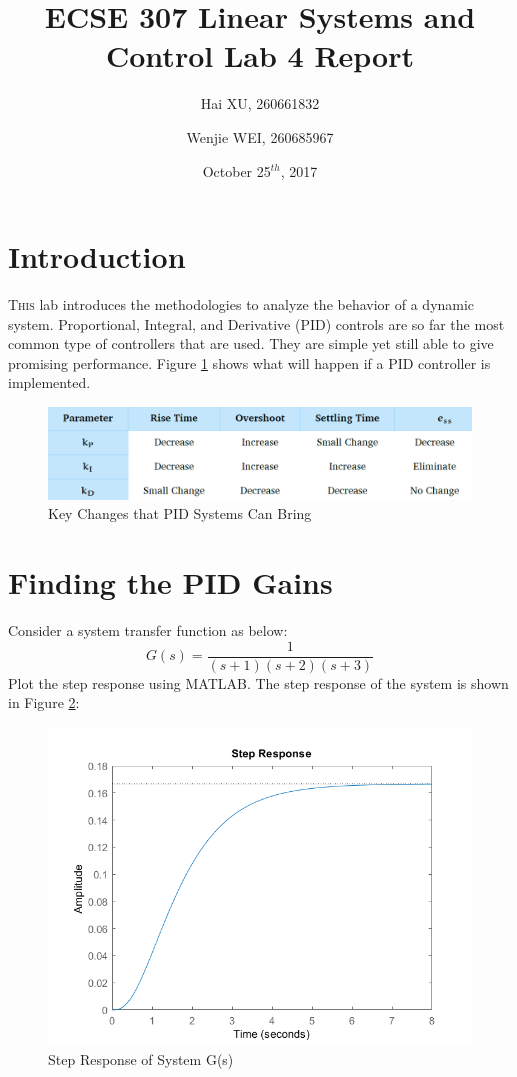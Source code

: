 \documentclass[a4paper, twocolumn, titlepage, 10pt]{article}
\title{\textbf{ECSE 307 Linear Systems and Control} \linebreak Lab 4 Report}
\author{Hai XU, 260661832 \and Wenjie WEI, 260685967}
\date{October 25$^{th}$, 2017}
\begin{document}
	\maketitle
	\section{Introduction}
		\lettrine{T}{his} lab introduces the methodologies to analyze the behavior of a dynamic system. Proportional, Integral, and Derivative (PID) controls are so far the most common type of controllers that are used. They are simple yet still able to give promising performance. Figure \ref{PIDData} shows what will happen if a PID controller is implemented.
		\begin{figure}[H]
			\centering
			\includegraphics[width=\linewidth]{PIDData}
			\caption{Key Changes that PID Systems Can Bring}
			\label{PIDData}
		\end{figure}
	\section{Finding the PID Gains}
		Consider a system transfer function as below:
		$$
			G(s) = \frac{1}{(s+1)(s+2)(s+3)}
		$$
		Plot the step response using MATLAB. The step response of the system is shown in Figure \ref{G_step}:
		\begin{figure}[H]
			\centering
			\includegraphics[width=\linewidth]{G_step}
			\caption{Step Response of System G(s)}
			\label{G_step}
		\end{figure}
		
\end{document}
